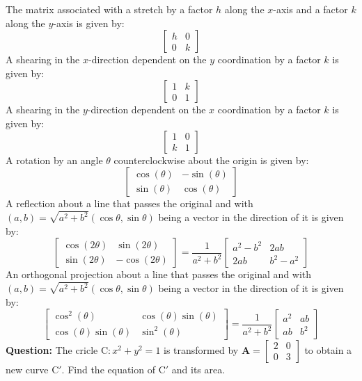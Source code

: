 \documentclass[a4paper,12pt]{report}
\begin{document}
The matrix associated with a stretch by a factor $h$ along the $x$-axis and a factor $k$ along the $y$-axis is given by:
\[\begin{bmatrix}
h & 0 \\
0 & k
\end{bmatrix}\]
A shearing in the $x$-direction dependent on the $y$ coordination by a factor $k$ is given by:
\[\begin{bmatrix}
1 & k \\
0 & 1
\end{bmatrix}\]
A shearing in the $y$-direction dependent on the $x$ coordination by a factor $k$ is given by:
\[\begin{bmatrix}
1 & 0 \\
k & 1
\end{bmatrix}\]
A rotation by an angle $\theta$ counterclockwise about the origin is given by:
\[\begin{bmatrix}
\cos(\theta) & -\sin(\theta) \\
\sin(\theta) & \cos(\theta)
\end{bmatrix}\]
A reflection about a line that passes the original and with $(a,b)=\sqrt{a^2+b^2}(\cos\theta,\sin\theta)$ being a vector in the direction of it is given by:
\[\begin{bmatrix}
\cos(2\theta) & \sin(2\theta) \\
\sin(2\theta) & -\cos(2\theta)
\end{bmatrix}=
\frac{1}{a^2+b^2}\begin{bmatrix}
a^2-b^2 & 2ab \\
2ab & b^2-a^2
\end{bmatrix}\]
An orthogonal projection about a line that passes the original and with $(a,b)=\sqrt{a^2+b^2}(\cos\theta,\sin\theta)$ being a vector in the direction of it is given by:
\[\begin{bmatrix}
\cos^2(\theta) & \cos(\theta)\sin(\theta) \\
\cos(\theta)\sin(\theta) & \sin^2(\theta)
\end{bmatrix}=
\frac{1}{a^2+b^2}\begin{bmatrix}
a^2 & ab \\
ab & b^2
\end{bmatrix}\]
\textbf{Question:} The cricle $\mathrm{C}: x^2+y^2=1$ is transformed by $\mathbf{A}=\begin{bmatrix}2&0\\0&3\end{bmatrix}$ to obtain a new curve $\mathrm{C}'$. Find the equation of $\mathrm{C}'$ and its area.
\end{document}
